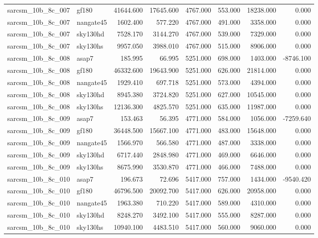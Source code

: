 \begin{tabular}{llrrrrrr}
sarcsm\_10b\_8c\_007 & gf180 & 41644.600 & 17645.600 & 4767.000 & 553.000 & 18238.000 & 0.000 \\
sarcsm\_10b\_8c\_007 & nangate45 & 1602.400 & 577.220 & 4767.000 & 491.000 & 3358.000 & 0.000 \\
sarcsm\_10b\_8c\_007 & sky130hd & 7528.170 & 3144.270 & 4767.000 & 539.000 & 7329.000 & 0.000 \\
sarcsm\_10b\_8c\_007 & sky130hs & 9957.050 & 3988.010 & 4767.000 & 515.000 & 8906.000 & 0.000 \\
sarcsm\_10b\_8c\_008 & asap7 & 185.995 & 66.995 & 5251.000 & 698.000 & 1403.000 & -8746.100 \\
sarcsm\_10b\_8c\_008 & gf180 & 46332.600 & 19643.900 & 5251.000 & 626.000 & 21814.000 & 0.000 \\
sarcsm\_10b\_8c\_008 & nangate45 & 1929.410 & 697.718 & 5251.000 & 573.000 & 4394.000 & 0.000 \\
sarcsm\_10b\_8c\_008 & sky130hd & 8945.380 & 3724.820 & 5251.000 & 627.000 & 10545.000 & 0.000 \\
sarcsm\_10b\_8c\_008 & sky130hs & 12136.300 & 4825.570 & 5251.000 & 635.000 & 11987.000 & 0.000 \\
sarcsm\_10b\_8c\_009 & asap7 & 153.463 & 56.395 & 4771.000 & 584.000 & 1056.000 & -7259.640 \\
sarcsm\_10b\_8c\_009 & gf180 & 36448.500 & 15667.100 & 4771.000 & 483.000 & 15648.000 & 0.000 \\
sarcsm\_10b\_8c\_009 & nangate45 & 1566.970 & 566.580 & 4771.000 & 487.000 & 3338.000 & 0.000 \\
sarcsm\_10b\_8c\_009 & sky130hd & 6717.440 & 2848.980 & 4771.000 & 469.000 & 6646.000 & 0.000 \\
sarcsm\_10b\_8c\_009 & sky130hs & 8675.990 & 3530.870 & 4771.000 & 466.000 & 7488.000 & 0.000 \\
sarcsm\_10b\_8c\_010 & asap7 & 196.673 & 72.696 & 5417.000 & 757.000 & 1434.000 & -9540.420 \\
sarcsm\_10b\_8c\_010 & gf180 & 46796.500 & 20092.700 & 5417.000 & 626.000 & 20958.000 & 0.000 \\
sarcsm\_10b\_8c\_010 & nangate45 & 1963.380 & 710.220 & 5417.000 & 589.000 & 4310.000 & 0.000 \\
sarcsm\_10b\_8c\_010 & sky130hd & 8248.270 & 3492.100 & 5417.000 & 555.000 & 8287.000 & 0.000 \\
sarcsm\_10b\_8c\_010 & sky130hs & 10940.100 & 4483.510 & 5417.000 & 560.000 & 9060.000 & 0.000 \\

\end{tabular}
